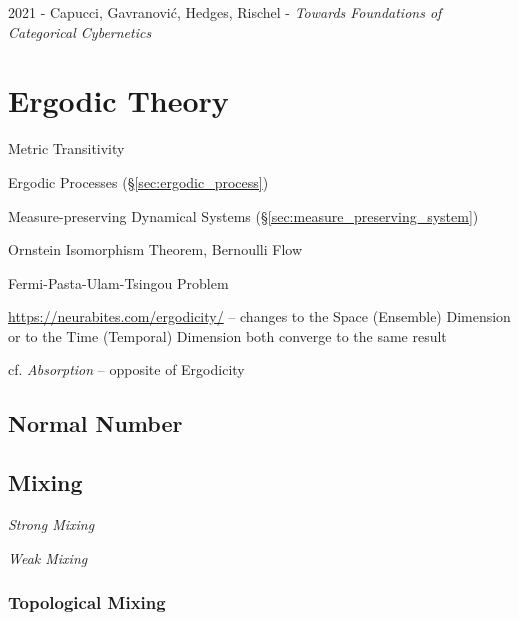 2021 - Capucci, Gavranovi\'c, Hedges, Rischel -
\emph{Towards Foundations of Categorical Cybernetics}



\section{Ergodic Theory}\label{sec:ergodic_theory}

Metric Transitivity

\fist Ergodic Processes (\S\ref{sec:ergodic_process})

\fist Measure-preserving Dynamical Systems
(\S\ref{sec:measure_preserving_system})

Ornstein Isomorphism Theorem, Bernoulli Flow

Fermi-Pasta-Ulam-Tsingou Problem

\url{https://neurabites.com/ergodicity/} -- changes to the Space (Ensemble)
Dimension or to the Time (Temporal) Dimension both converge to the same result

cf. \emph{Absorption} -- opposite of Ergodicity



\subsection{Normal Number}\label{sec:normal_number}

\subsection{Mixing}\label{sec:mixing}

\emph{Strong Mixing}

\emph{Weak Mixing}



\subsubsection{Topological Mixing}\label{sec:topological_mixing}



